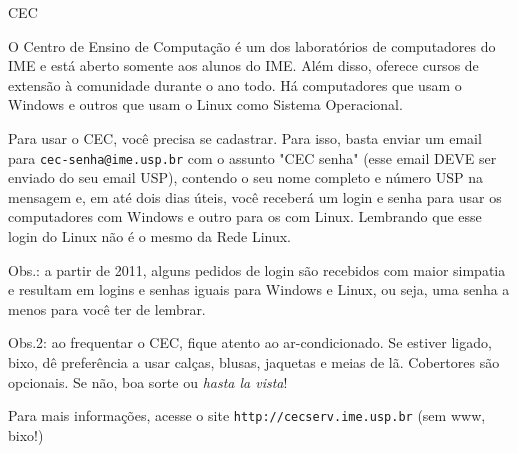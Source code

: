 \begin{secao}{CEC}

O Centro de Ensino de Computação é um dos laboratórios de computadores do IME e está
aberto somente aos alunos do IME. Além disso, oferece cursos de extensão à comunidade 
durante o ano todo. Há computadores que usam o Windows e outros que usam o Linux como
Sistema Operacional.

Para usar o CEC, você precisa se cadastrar. Para isso, basta enviar um email para
{\tt cec-senha@ime.usp.br} com o assunto "CEC senha" (esse email DEVE ser
enviado do seu email USP), contendo o seu nome completo e número USP na mensagem
e, em até dois dias úteis, você receberá um login e senha para usar os computadores
com Windows e outro para os com Linux. Lembrando que esse login do Linux não é o mesmo
da Rede Linux.

Obs.: a partir de 2011, alguns pedidos de login são recebidos com maior simpatia e
resultam em logins e senhas iguais para Windows e Linux, ou seja, uma senha a
menos para você ter de lembrar.

Obs.2: ao frequentar o CEC, fique atento ao ar-condicionado. Se
estiver ligado, bixo, dê preferência a usar calças, blusas, jaquetas e meias de
lã. Cobertores são opcionais. Se não, boa sorte ou \textit{hasta la vista}!

Para mais informações, acesse o site {\tt http://cecserv.ime.usp.br} (sem www, bixo!)
\end{secao}
